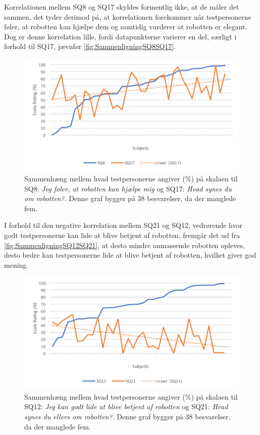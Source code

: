 \noindent
%
Korrelationen mellem SQ8 og SQ17 skyldes formentlig ikke, at de måler det sammen, det tyder derimod på, at korrelationen forekommer når testpersonerne føler, at robotten kan hjælpe dem og samtidig vurderer at robotten er elegant. Dog er denne korrelation lille, fordi datapunkterne varierer en del, særligt i forhold til SQ17, jævnfør \autoref{fig:SammenligningSQ8SQ17}.  
%
\begin{figure}[H]
	\centering
	\includegraphics[width=\textwidth]{Figure/Korrelationsgrafer/SQ8+SQ17}
	\caption{Sammenhæng mellem hvad testpersonerne angiver (\%) på skalaen til SQ8: \textit{Jeg føler, at robotten kan hjælpe mig} og SQ17: \textit{Hvad synes du om robotten?}. Denne graf bygger på 38 besvarelser, da der manglede fem.}
	\label{fig:SammenligningSQ8SQ17}
\end{figure}
\noindent
I forhold til den negative korrelation mellem SQ21 og SQ12, vedrørende hvor godt testpersonerne kan lide at blive betjent af robotten, fremgår det ud fra \autoref{fig:SammenligningSQ12SQ21}, at desto mindre anmassende robotten opleves, desto bedre kan testpersonerne lide at blive betjent af robotten, hvilket giver god mening. 
%
\begin{figure}[H]
	\centering
	\includegraphics[width=\textwidth]{Figure/Korrelationsgrafer/SQ12+SQ21}
	\caption{Sammenhæng mellem hvad testpersonerne angiver (\%) på skalaen til SQ12: \textit{Jeg kan godt lide at blive betjent af robotten} og SQ21: \textit{Hvad synes du ellers om robotten?}. Denne graf bygger på 38 besvarelser, da der manglede fem.}
	\label{fig:SammenligningSQ12SQ21}
\end{figure}
